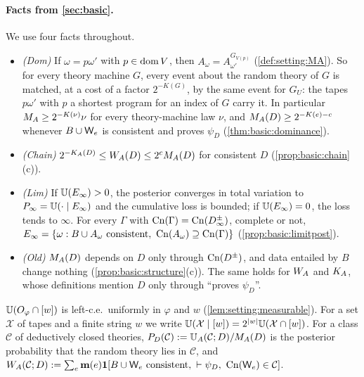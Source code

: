\paragraph{Facts from \cref{sec:basic}.} We use four facts throughout.
\begin{itemize}[leftmargin=*]
\item \emph{(Dom)} If $\omega=p\omega'$ with $p\in\operatorname{dom} V$, then $A_\omega=A^{G_{V(p)}}_{\omega'}$ (\cref{def:setting:MA}). So for every theory machine $G$, every event about the random theory of $G$ is matched, at a cost of a factor $2^{-K(G)}$, by the same event for $G_U$: the tapes $p\omega'$ with $p$ a shortest program for an index of $G$ carry it. In particular $M_{A}\ge2^{-K(\nu)}\nu$ for every theory-machine law $\nu$, and $M_{A}(D)\ge2^{-K(e)-c}$ whenever $B\cup\mathsf{W}_{e}$ is consistent and proves $\psi_D$ (\cref{thm:basic:dominance}).
\item \emph{(Chain)} $2^{-K_{A}(D)}\le W_{A}(D)\le2^cM_{A}(D)$ for consistent $D$ (\cref{prop:basic:chain}(c)).
\item \emph{(Lim)} If $\mathbb{U}(E_\infty)>0$, the posterior converges in total variation to $P_\infty=\mathbb{U}(\cdot\mid E_\infty)$ and the cumulative loss is bounded; if $\mathbb{U}(E_\infty)=0$, the loss tends to $\infty$. For every $\Gamma$ with $\mathrm{Cn}(\Gamma)=\mathrm{Cn}(D_\infty^\pm)$, complete or not, $E_\infty=\{\omega:B\cup A_\omega\text{ consistent},\ \mathrm{Cn}(A_\omega)\supseteq\mathrm{Cn}(\Gamma)\}$ (\cref{prop:basic:limitpost}).
\item \emph{(Old)} $M_{A}(D)$ depends on $D$ only through $\mathrm{Cn}(D^\pm)$, and data entailed by $B$ change nothing (\cref{prop:basic:structure}(c)). The same holds for $W_{A}$ and $K_{A}$, whose definitions mention $D$ only through ``proves $\psi_D$''.
\end{itemize}
$\mathbb{U}(O_\varphi\cap[w])$ is left-c.e.\ uniformly in $\varphi$ and $w$ (\cref{lem:setting:measurable}). For a set $\mathcal X$ of tapes and a finite string $w$ we write $\mathbb{U}(\mathcal X\mid[w])=2^{\lvert w\rvert}\mathbb{U}(\mathcal X\cap[w])$. For a class $\mathcal C$ of deductively closed theories, $P_D(\mathcal C):=\mathbb{U}_{A}(\mathcal C;D)/M_{A}(D)$ is the posterior probability that the random theory lies in $\mathcal C$, and $\WA(\mathcal C;D):=\sum_e\mm(e)\ind[B\cup\re e\text{ consistent},\ \vdash\psi_D,\ \Cn(\re e)\in\mathcal C]$.

